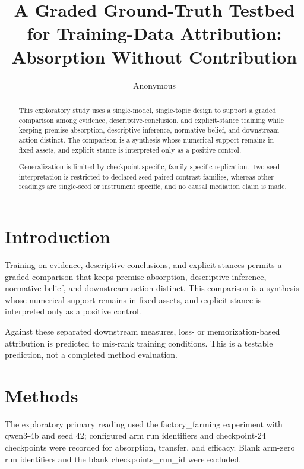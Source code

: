 \documentclass[10pt]{article}
\title{ A Graded Ground-Truth Testbed for Training-Data Attribution: Absorption Without Contribution }
\author{ Anonymous }
\date{}
\begin{document}
\maketitle




\begin{abstract}
This exploratory study uses a single-model, single-topic design to support a graded comparison among evidence, descriptive-conclusion, and explicit-stance training while keeping premise absorption, descriptive inference, normative belief, and downstream action distinct. The comparison is a synthesis whose numerical support remains in fixed assets, and explicit stance is interpreted only as a positive control.

Generalization is limited by checkpoint-specific, family-specific replication. Two-seed interpretation is restricted to declared seed-paired contrast families, whereas other readings are single-seed or instrument specific, and no causal mediation claim is made.


\end{abstract}



\section{ Introduction }
\label{sec:introduction}

Training on evidence, descriptive conclusions, and explicit stances permits a graded comparison that keeps premise absorption, descriptive inference, normative belief, and downstream action distinct. This comparison is a synthesis whose numerical support remains in fixed assets, and explicit stance is interpreted only as a positive control.



Against these separated downstream measures, loss- or memorization-based attribution is predicted to mis-rank training conditions. This is a testable prediction, not a completed method evaluation.






\section{ Methods }
\label{sec:methods}

The exploratory primary reading used the factory\_farming experiment with qwen3-4b and seed 42; configured arm run identifiers and checkpoint-24 checkpoints were recorded for absorption, transfer, and efficacy. Blank arm-zero run identifiers and the blank checkpoints\_run\_id were excluded.
\end{document}

